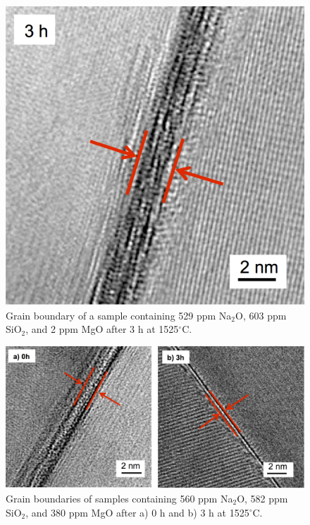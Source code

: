 \newpage
\begin{figure}[H]
	\centering
	\includegraphics{Chapter-3/Figures/Figure6.png}
	\caption{Grain boundary of a sample containing 529 ppm Na$_{2}$O, 603 ppm SiO$_{2}$, and 2 ppm MgO after 3 h at 1525$^{\circ}$C.}
	\label{Ch3-figure:Figure6}
\end{figure}

\newpage
\begin{figure}[H]
	\centering
	\includegraphics[width=\textwidth]{Chapter-3/Figures/Figure7.png}
	\caption{Grain boundaries of samples containing 560 ppm Na$_{2}$O, 582 ppm SiO$_{2}$, and 380 ppm MgO after a) 0 h and b) 3 h at 1525$^{\circ}$C.}
	\label{Ch3-figure:Figure7}
\end{figure}

